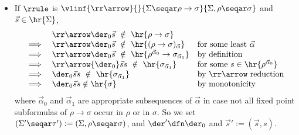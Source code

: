 \begin{definition}
\begin{itemize}
\item If $\rrule$ is
    \(
    \vlinf{\rr\arrow}{}{\Sigma \seqar \rho \to \sigma }{\Sigma, \rho \seqar \sigma}
    \)
    and $\vec s \in \hr{\Sigma}$,
    \[
    \begin{array}{rll}
         & {\rr\arrow } {\der_0}\vec s\  \notin\  \hr{\rho\to \sigma} & \\
         \implies & {\rr \arrow} {\der_0} \vec s \  \notin\  \hr{(\rho \to \sigma)_{\vec \alpha}} & \text{for some least $\vec \alpha$}\\
         \implies & \rr \arrow  \der_0  \vec s\  \notin \ \hr{\rho^{\vec \alpha_0} \to \sigma_{\vec \alpha_1}} & \text{by definition} \\
         \implies & \rr \arrow{\der_0}  \vec s s \ \notin\  \hr{ \sigma_{\vec \alpha_1}} & \text{for some $s \in \hr{\rho^{\vec \alpha_0}}$} \\
         \implies & \der_0 \vec s  s\  \notin \ \hr{ \sigma_{\vec \alpha_1}} & \text{by $\rr\arrow$ reduction} \\
         \implies & \der_0 \vec s s \notin \hr{ \sigma} & \text{by monotonicity}
    \end{array}
    \]
    where $\vec \alpha_0$ and $\vec \alpha_1$ are appropriate subsequences of $\vec \alpha$ in case not all fixed point subformulas of $\rho \to \sigma$ occur in $\rho$ or in $\sigma$.
    So we set $(\Sigma' \seqar \tau') := (\Sigma, \rho \seqar \sigma)$, and $\der' \dfn \der_0$ and $\vec s' := (\vec s,s)$.
    

\end{itemize}
\end{definition}
